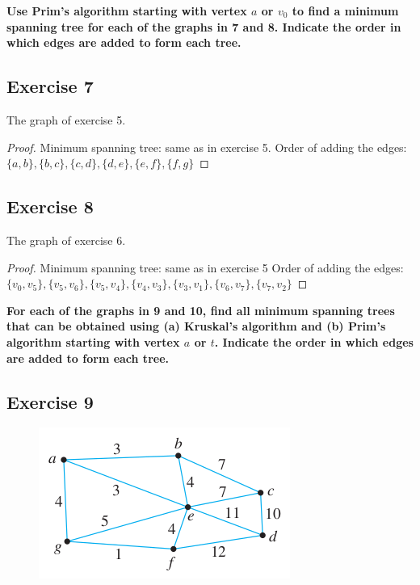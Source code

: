 \documentclass[14pt]{extarticle}
\newcommand{\cy}{\color{cyan}}
\begin{document}
{\bf \cy Use Prim’s algorithm starting with vertex \(a\) or \(v_0\) to find a minimum spanning tree for each of the graphs 
in 7 and 8. Indicate the order in which edges are added to form each tree.}

\subsection{Exercise 7}
The graph of exercise 5.
\begin{proof}
Minimum spanning tree: same as in exercise 5. Order of adding the edges:
\(\{a, b\}, \{b, c\}, \{c, d\}, \{d, e\}, \{e, f\}, \{f, g\}\)
\end{proof}

\subsection{Exercise 8}
The graph of exercise 6.
\begin{proof}
Minimum spanning tree: same as in exercise 5 Order of adding the edges: \(\{v_0, v_5\}, \{v_5, v_6\}, \{v_5, v_4\}, 
\{v_4, v_3\}, \{v_3, v_1\}, \{v_6, v_7\}, \{v_7, v_2\}\)
\end{proof}

{\bf \cy For each of the graphs in 9 and 10, find all minimum spanning trees that can be obtained using (a) Kruskal’s 
algorithm and (b) Prim’s algorithm starting with vertex \(a\) or \(t\). Indicate the order in which edges are added to form 
each tree.}

\subsection{Exercise 9}
\begin{figure}[ht!]
\centering
\includegraphics[scale=0.5]{../images/10.6.9.png}
\end{figure}
\end{document}
